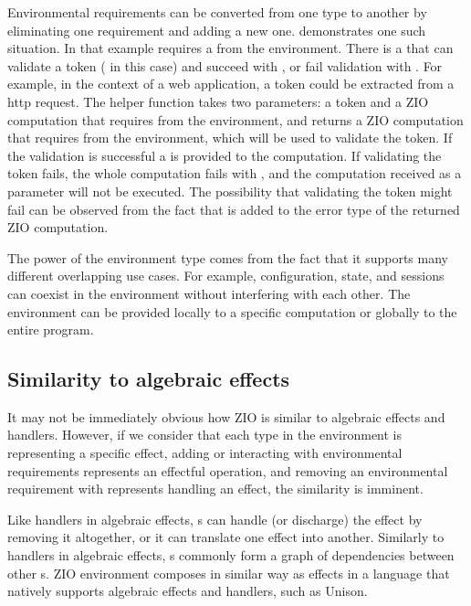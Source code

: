 Environmental requirements can be converted from one type to another by eliminating one requirement and adding a new one.  demonstrates one such situation. In that example  requires a  from the environment. There is a  that can validate a token ( in this case) and succeed with , or fail validation with . For example, in the context of a web application, a token could be extracted from a http request. The helper function  takes two parameters: a token and a ZIO computation that requires  from the environment, and returns a ZIO computation that requires  from the environment, which will be used to validate the token. If the validation is successful a  is provided to the computation. If validating the token fails, the whole computation fails with , and the computation received as a parameter will not be executed. The possibility that validating the token might fail can be observed from the fact that   is added to the error type of the returned ZIO computation.



The power of the environment type comes from the fact that it supports many different overlapping use cases. For example, configuration, state, and sessions can coexist in the environment without interfering with each other. The environment can be provided locally to a specific computation or globally to the entire program.


\subsection{Similarity to algebraic effects}
It may not be immediately obvious how ZIO is similar to algebraic effects and handlers.
However, if we consider that each type in the environment is representing a specific effect, adding or interacting with environmental requirements represents an effectful operation, and removing an environmental requirement with  represents handling an effect, the similarity is imminent.

Like handlers in algebraic effects, s can handle (or discharge) the effect by removing it altogether, or it can translate one effect into another. Similarly to handlers in algebraic effects, s commonly form a graph of dependencies between other s. ZIO environment composes in similar way as effects in a language that natively supports algebraic effects and handlers, such as Unison.

